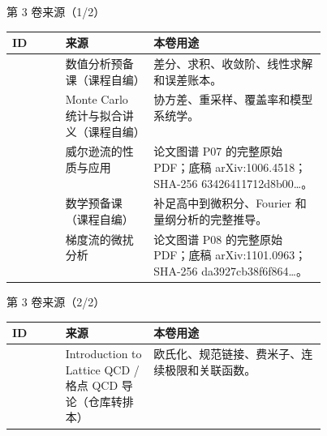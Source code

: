 \begin{frame}[t]{第 3 卷来源（1/2）}
\scriptsize\begin{tabularx}{\linewidth}{p{0.17\linewidth}p{0.28\linewidth}Y}
\toprule ID & 来源 & 本卷用途\\\midrule
{} & 数值分析预备课（课程自编） & 差分、求积、收敛阶、线性求解和误差账本。\\
 & Monte Carlo 统计与拟合讲义（课程自编） & 协方差、重采样、覆盖率和模型系统学。\\
 & 威尔逊流的性质与应用 & 论文图谱 P07 的完整原始 PDF；底稿 arXiv:1006.4518；SHA-256 63426411712d8b00…。\\
 & 数学预备课（课程自编） & 补足高中到微积分、Fourier 和量纲分析的完整推导。\\
 & 梯度流的微扰分析 & 论文图谱 P08 的完整原始 PDF；底稿 arXiv:1101.0963；SHA-256 da3927cb38f6f864…。\\
\bottomrule\end{tabularx}\end{frame}

\begin{frame}[t]{第 3 卷来源（2/2）}
\scriptsize\begin{tabularx}{\linewidth}{p{0.17\linewidth}p{0.28\linewidth}Y}
\toprule ID & 来源 & 本卷用途\\\midrule
{} & Introduction to Lattice QCD /\allowbreak{} 格点 QCD 导论（仓库转排本） & 欧氏化、规范链接、费米子、连续极限和关联函数。\\
\bottomrule\end{tabularx}\end{frame}

